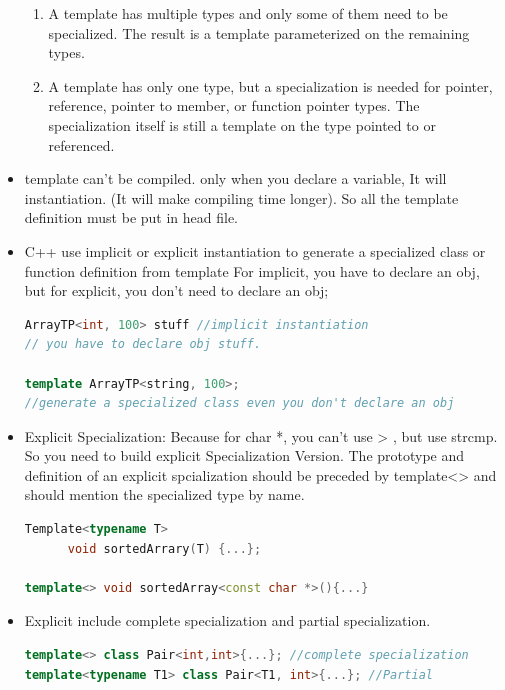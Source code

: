 \documentclass[a4paper,12pt,twoside]{book}
\begin{document}
\begin{itemize}
\begin{enumerate}
\item A template has multiple types and only some of them need to be specialized. The result is a template parameterized on the remaining types.

\item A template has only one type, but a specialization is needed for pointer, reference, pointer to member, or function pointer types. The specialization itself is still a template on the type pointed to or referenced.
\end{enumerate}


\item template can't be compiled. only when you declare a variable, It will instantiation. (It will make compiling time longer). So all the template definition must be put in head file.

\item C++ use implicit or explicit instantiation to generate a specialized class or function definition from template
For implicit, you have to declare an obj, but for explicit, you don't need to declare an obj;
\begin{lstlisting}[frame=single, language=c++]
ArrayTP<int, 100> stuff //implicit instantiation
// you have to declare obj stuff.

template ArrayTP<string, 100>;
//generate a specialized class even you don't declare an obj
\end{lstlisting}


\item Explicit Specialization: Because for char *, you can't use > , but use strcmp.  So you need to build explicit Specialization Version. The prototype and definition of an explicit spcialization should be preceded by template<> and should mention the specialized type by name.
\begin{lstlisting}[frame=single, language=c++]
Template<typename T>
      void sortedArrary(T) {...};

template<> void sortedArray<const char *>(){...}
\end{lstlisting}


\item Explicit include complete specialization and partial specialization.
\begin{lstlisting}[frame=single, language=c++]
template<> class Pair<int,int>{...}; //complete specialization
template<typename T1> class Pair<T1, int>{...}; //Partial
\end{lstlisting}


\end{itemize}
\end{document}
